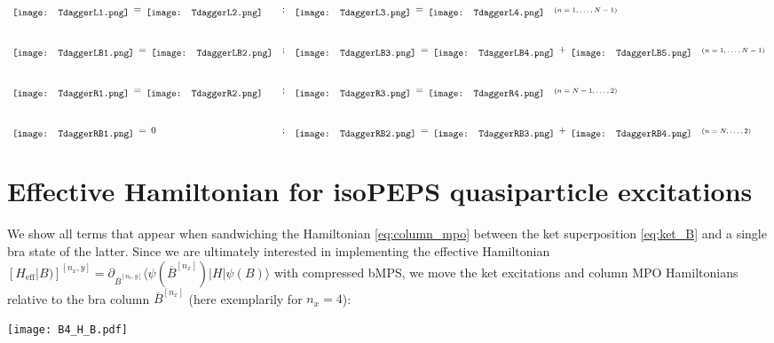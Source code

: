 \vspace*{2em}

\begin{equation*}
\begin{array}{l c l}
	\raisebox{-0.5\height}{\texttt{[image: TdaggerL1.png]}} 
	\:=\:
	\raisebox{-0.5\height}{\texttt{[image: TdaggerL2.png]}} 
\hspace{1em}& ; &
	\raisebox{-0.5\height}{\texttt{[image: TdaggerL3.png]}} 
	\:=\:
	\raisebox{-0.5\height}{\texttt{[image: TdaggerL4.png]}}
	\hspace{1em} \text{\scriptsize{$(n = 1, \ldots, N-1)$}}
\\[3em]
	\raisebox{-0.5\height}{\texttt{[image: TdaggerLB1.png]}} 
	\:=\: 
	\raisebox{-0.5\height}{\texttt{[image: TdaggerLB2.png]}} 
& ; &
	\raisebox{-0.5\height}{\texttt{[image: TdaggerLB3.png]}} 
	\:=\: 
	\raisebox{-0.5\height}{\texttt{[image: TdaggerLB4.png]}}
	\:+\:
	\raisebox{-0.5\height}{\texttt{[image: TdaggerLB5.png]}}
	\hspace{1em} \text{\scriptsize{$(n = 1, \ldots, N-1)$}}
\\[3em]
	\raisebox{-0.5\height}{\texttt{[image: TdaggerR1.png]}} 
	\:=\:
	\raisebox{-0.5\height}{\texttt{[image: TdaggerR2.png]}} 
& ; &
	\raisebox{-0.5\height}{\texttt{[image: TdaggerR3.png]}} 
	\:=\: 
	\raisebox{-0.5\height}{\texttt{[image: TdaggerR4.png]}}
	\hspace{1em} \text{\scriptsize{$(n = N-1, \ldots, 2)$}}
\\[3em]
	\raisebox{-0.5\height}{\texttt{[image: TdaggerRB1.png]}} 
	\:=\: 0
& ; &
	\raisebox{-0.5\height}{\texttt{[image: TdaggerRB2.png]}} 
	\:=\: 
	\raisebox{-0.5\height}{\texttt{[image: TdaggerRB3.png]}}
	\:+\:
	\raisebox{-0.5\height}{\texttt{[image: TdaggerRB4.png]}}
	\hspace{1em} \text{\scriptsize{$(n = N, \ldots, 2)$}}
\end{array}
\end{equation*}


\newpage
\section*{Effective Hamiltonian for isoPEPS quasiparticle excitations}
We show all terms that appear when sandwiching the Hamiltonian \eqref{eq:column_mpo} between the ket superposition \eqref{eq:ket_B} and a single bra state of the latter. Since we are ultimately interested in implementing the effective Hamiltonian $\left[ H_{\text{eff}} \vert B ) \right]^{[n_x, y]} = \partial_{\overline{B}^{[n_x, y]}} \langle \psi(\overline{B}^{[n_x]}) \vert H \vert \psi(B) \rangle$ with compressed bMPS, we move the ket excitations and column MPO Hamiltonians relative to the bra column $\overline{B}^{[n_x]}$ (here exemplarily for $n_x = 4$):
\begin{center}
\vspace*{-0.5em}
\texttt{[image: B4\_H\_B.pdf]}
\end{center}

